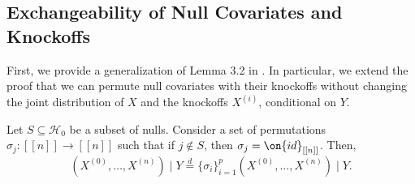 \documentclass[12pt,reqno]{amsart}
\numberwithin{equation}{section}
\begin{document}
\subsection{Exchangeability of Null Covariates and Knockoffs}
First, we provide a generalization of Lemma 3.2 in \cite{panning}. In particular, we extend the proof that we can permute null covariates with their knockoffs without changing the joint distribution of $X$ and the knockoffs $X^{(i)}$, conditional on $Y$.
\begin{lem}
\label{lemma3.2}
Let $S \subseteq \mathcal{H}_0$ be a subset of nulls. Consider a set of permutations $\sigma_j : [[ n ]] \to [[ n ]]$ such that if $j \not \in S$, then $\sigma_j = \on{id}_{[[ n ]]}$. Then,
\[(X^{(0)}, \ldots, X^{(n)}) \mid Y \overset{d}= \{ \sigma_i \}_{i=1}^p \left( X^{(0)}, \ldots, X^{(n)} \right) \mid Y. \]
\end{lem}
\end{document}
